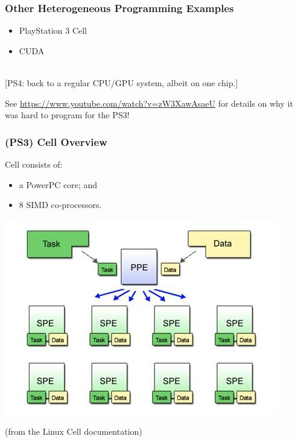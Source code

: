 \begin{frame}
  \frametitle{Other Heterogeneous Programming Examples}


\begin{itemize}
\item PlayStation 3 Cell\\
\item CUDA
\end{itemize}
~\\[1em]
[PS4: back to a regular CPU/GPU system, albeit on one chip.]

See \url{https://www.youtube.com/watch?v=zW3XawAsaeU} for details on why it was hard to program for the PS3!

\end{frame}

\begin{frame}
  \frametitle{(PS3) Cell Overview}


  Cell consists of:
  \begin{itemize}
    \item a PowerPC core; and
    \item 8 SIMD co-processors.
  \end{itemize}


  \begin{center}
    \includegraphics[scale=0.5]{images/cell}
  \end{center}
  \hfill (from the Linux Cell documentation)

\end{frame}

